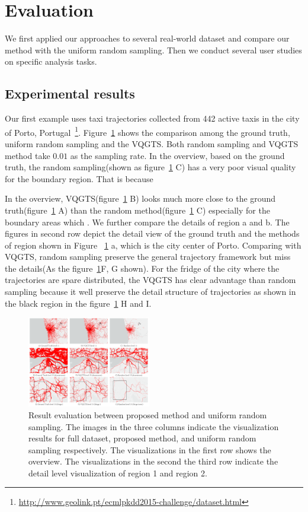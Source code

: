 \section{Evaluation}
We first applied our approaches to several real-world dataset and compare our method with the uniform random sampling. Then we conduct several user studies on specific analysis tasks. 
\subsection{Experimental results}

Our first example uses taxi trajectories collected from 442 active taxis in the city of Porto, Portugal~\footnote{\url{http://www.geolink.pt/ecmlpkdd2015-challenge/dataset.html}}. Figure~\ref{fig:random_proposed} shows the comparison among the ground truth, uniform random sampling and the VQGTS. Both random sampling and VQGTS method take $0.01$ as the sampling rate. 
In the overview, based on the ground truth, the random sampling(shown as figure~\ref{fig:random_proposed} C) has a very poor visual quality for the boundary region. That is because 

In the overview, VQGTS(figure~\ref{fig:random_proposed} B) looks much more close to the ground truth(figure~\ref{fig:random_proposed} A) than the random method(figure~\ref{fig:random_proposed} C) especially for the boundary areas which . We further compare the details of region a and b. The figures in second row depict the detail view of the ground truth and the methods of region shown in Figure ~\ref{fig:random_proposed} a, which is the city center of Porto. Comparing with VQGTS, random sampling preserve the general trajectory framework but miss the details(As the figure~\ref{fig:random_proposed}F, G shown). For the fridge of the city where the trajectories are spare distributed, the VQGTS has clear advantage than random sampling because it well preserve the detail structure of trajectories as shown in the black region in the figure~\ref{fig:random_proposed} H and I. 

\begin{figure}[t]
	\centering
	\includegraphics[width=0.48\textwidth]{pictures/experiment_study/Mehtod_resolution_study.pdf}
	\vspace{-5mm}
	\caption{Result evaluation between proposed method and uniform random sampling. The images in the three columns indicate the visualization results for full dataset, proposed method, and uniform random sampling respectively. The visualizations in the first row shows the overview. The visualizations in the second the third row indicate the detail level visualization of region 1 and region 2. }
	\vspace{-5mm}
	\label{fig:random_proposed}
\end{figure}


